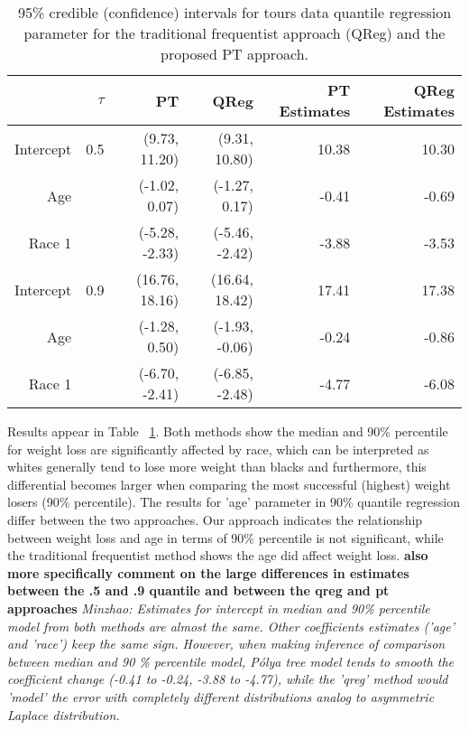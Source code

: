 \documentclass[12pt]{article}
\newcommand{\polya}{P\'{o}lya}
\begin{document}
\begin{table}[h]
  \caption[]{\label{tab:tours} 95\% credible (confidence) intervals for
    tours data quantile regression parameter for the
    traditional frequentist approach (QReg) and the proposed PT approach.}
  \vspace{4mm}

  \centering
  \begin{tabular}{rrrrrr}
    \hline
    & $\tau$ & PT             & QReg           & PT Estimates
    & QReg Estimates                                           \\
    \hline
    Intercept & 0.5    & (9.73, 11.20)  & (9.31, 10.80)  & 10.38 & 10.30 \\
    Age       &        & (-1.02, 0.07)  & (-1.27, 0.17)  & -0.41 & -0.69 \\
    Race 1    &        & (-5.28, -2.33) & (-5.46, -2.42) & -3.88 & -3.53 \\
    \hline
    Intercept & 0.9    & (16.76, 18.16) & (16.64, 18.42) & 17.41 & 17.38 \\
    Age       &        & (-1.28, 0.50)  & (-1.93, -0.06) & -0.24 & -0.86 \\
    Race 1    &        & (-6.70, -2.41) & (-6.85, -2.48) & -4.77 & -6.08 \\
    \hline
  \end{tabular}
\end{table}

Results appear in Table ~\ref{tab:tours}.  Both methods show the median
and 90\% percentile for weight loss are significantly affected by
race, which can be interpreted as whites generally tend to lose more
weight than blacks and furthermore, this differential becomes larger
when comparing the most successful (highest) weight losers (90\%
percentile). The results for 'age' parameter in 90\% quantile
regression differ between the two approaches.  Our approach indicates
the relationship between weight loss and age in terms of 90\%
percentile is not significant, while the traditional frequentist
method shows the age did affect weight loss.  {\bf also more
  specifically comment on the large differences in estimates between
  the .5 and .9 quantile and between the qreg and pt approaches} {\it
  Minzhao: Estimates for intercept in median and 90\% percentile model
  from both methods are almost the same. Other coefficients estimates
  ('age' and 'race') keep the same sign. However, when making
  inference of comparison between median and 90 \% percentile model,
  \polya{} tree model tends to smooth the coefficient change (-0.41 to
  -0.24, -3.88 to -4.77), while the 'qreg' method would 'model' the
  error with completely different distributions analog to asymmetric
  Laplace distribution.}
\end{document}
